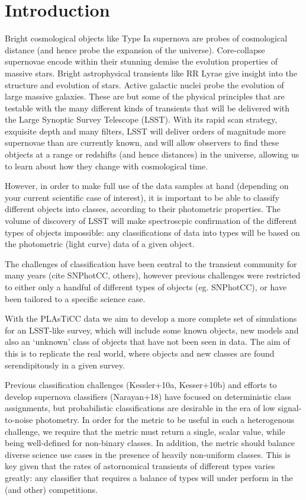 \section{Introduction}
\label{sec:intro}

Bright cosmological objects like Type Ia supernova are probes of cosmological distance (and hence probe the expansion of the universe). Core-collapse supernovae encode within their stunning demise the evolution properties of massive stars. Bright astrophysical transients like RR Lyrae give insight into the structure and evolution of stars. Active galactic nuclei probe the evolution of large massive galaxies. These are but some of the physical principles that are testable with the many different kinds of transients that will be delivered with the Large Synoptic Survey Telescope (LSST). With its rapid scan strategy, exquisite depth and many filters, LSST will deliver orders of magnitude more supernovae than are currently known, and will allow observers to find these obtjects at a range or redshifts (and hence distances) in the universe, allowing us to learn about how they change with cosmological time.

However, in order to make full use of the data samples at hand (depending on your current scientific case of interest), it is important to be able to classify different objects into classes, according to their photometric properties. The volume of discovery of LSST will make spectroscpic confirmation of the different types of objects impossible: any classifications of data into types will be based on the photometric (light curve) data of a given object.

The challenges of classification have been central to the transient community for many years (cite SNPhotCC, others), however previous challenges were restricted to either only a handful of different types of objects (eg. SNPhotCC), or have been tailored to a specific science case.

With the PLAsTiCC data we aim to develop a more complete set of simulations for an LSST-like survey, which will include some known objects, new models and also an `unknown' class of objects that have not been seen in data. The aim of this is to replicate the real world, where objects and new classes are found serendipitously in a given survey.


Previous classification challenges (Kessler+10a, Kesser+10b) and efforts to develop supernova classifiers (Narayan+18) have focused on deterministic class assignments, but probabilistic classifications are desirable in the era of low signal-to-noise photometry. In order for the metric to be useful in such a heterogenous challenge, we require that the metric must return a single, scalar value, while being well-defined for non-binary classes.
In addition, the metric should balance diverse science use cases in the presence of heavily non-uniform classes. This is key given that the rates of astornomical transients of different types varies greatly: any classifier that requires a balance of types will under perform in the \plasticc (and other) competitions.

